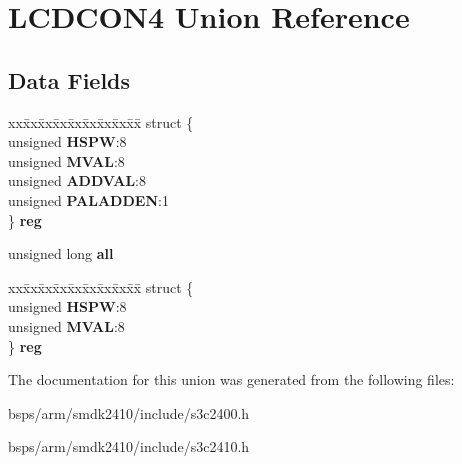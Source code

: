 \hypertarget{unionLCDCON4}{}\section{L\+C\+D\+C\+O\+N4 Union Reference}
\label{unionLCDCON4}
\subsection*{Data Fields}
\begin{DoxyCompactItemize}
\item 
\mbox{\label{unionLCDCON4_ae4365ac53fca9ac937f80d396aca7eb2}} 
\begin{tabbing}
xx\=xx\=xx\=xx\=xx\=xx\=xx\=xx\=xx\=\kill
struct \{\\
\>unsigned {\bfseries HSPW}:8\\
\>unsigned {\bfseries MVAL}:8\\
\>unsigned {\bfseries ADDVAL}:8\\
\>unsigned {\bfseries PALADDEN}:1\\
\} {\bfseries reg}\\

\end{tabbing}\item 
\mbox{\label{unionLCDCON4_aafee3808121f5149f628841458ecad1a}} 
unsigned long {\bfseries all}
\item 
\mbox{\label{unionLCDCON4_ad3a7d3b055df1fba1bcfdf4c67c1b6ae}} 
\begin{tabbing}
xx\=xx\=xx\=xx\=xx\=xx\=xx\=xx\=xx\=\kill
struct \{\\
\>unsigned {\bfseries HSPW}:8\\
\>unsigned {\bfseries MVAL}:8\\
\} {\bfseries reg}\\

\end{tabbing}\end{DoxyCompactItemize}


The documentation for this union was generated from the following files\+:\begin{DoxyCompactItemize}
\item 
bsps/arm/smdk2410/include/s3c2400.\+h\item 
bsps/arm/smdk2410/include/s3c2410.\+h\end{DoxyCompactItemize}
